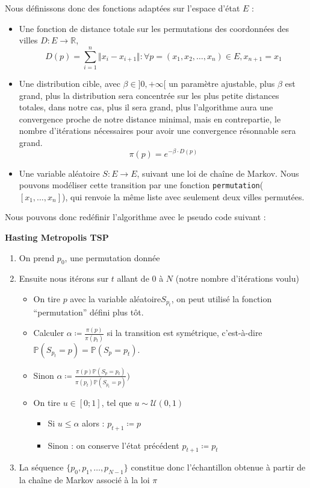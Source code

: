 \documentclass{article}
\begin{document}
Nous définissons donc des fonctions adaptées sur l'espace d'état $E$ : \begin{itemize} \item Une fonction de distance totale sur les permutations des coordonnées des villes $ D : E \to \mathbb{R} $,
    \[ D(p) = \sum_{i = 1}^{n} \Vert x_i - x_{i+1}\Vert : \forall p = (x_1,x_2,\ldots , x_n) \in E, x_{n+1} = x_{1}\]

    \item Une distribution cible, avec $\beta \in ]0,+\infty[$ un paramètre ajustable, plus $\beta$ est grand, plus la distribution sera concentrée sur les plus petite distances totales, dans notre cas, plus il sera grand, plus l'algorithme aura une convergence proche de notre distance minimal, mais en contrepartie, le nombre d'itérations nécessaires pour avoir une convergence résonnable sera grand.
    \[ \pi(p) = e^{-\beta \cdot D(p)} \]
    
    \item Une variable aléatoire $S: E \to E$, suivant une loi de chaîne de Markov.  
    Nous pouvons modéliser cette transition par une fonction \texttt{permutation}( $[x_1, \ldots, x_n]$), qui renvoie la même liste avec seulement deux villes permutées. 
\end{itemize}

Nous pouvons donc redéfinir l'algorithme avec le pseudo code suivant :

{\bf Hasting Metropolis TSP} \begin{enumerate}
    \item On prend $p_0$, une permutation donnée
    \item Ensuite nous itérons sur $t$ allant de 0 à $N$ (notre nombre d'itérations voulu)
    \begin{itemize}
        \item On tire $p$ avec la variable aléatoire$S_{p_t}$, on peut utilisé la fonction ``permutation'' défini plus tôt.
        \item Calculer $\alpha \coloneqq \frac{\pi(p)}{\pi(p_t)}$ si la transition est symétrique, c'est-à-dire $\mathbb{P}(S_{p_t} = p) = \mathbb{P}(S_p = p_t)$.
        \item Sinon $\alpha \coloneqq \frac{\pi(p) \mathbb{P}(S_p = p_t)}{\pi(p_t) \mathbb{P}(S_{p_t} = p) } ) $ 

        \item On tire $u \in [0;1]$, tel que $u  \sim \mathcal{U}(0,1)$ 
        \begin{itemize}
            \item Si $u \leqslant \alpha$ alors : $p_{t+1} \coloneqq p$  
            \item Sinon : on conserve l'état précédent $p_{t+1} \coloneqq p_t$  
        \end{itemize}
    \end{itemize}
    \item La séquence $\{p_0,p_1, \ldots ,p_{N-1}\}$ constitue donc l'échantillon obtenue à partir de la chaîne de Markov associé à la loi $\pi$
\end{enumerate}
\end{document}
